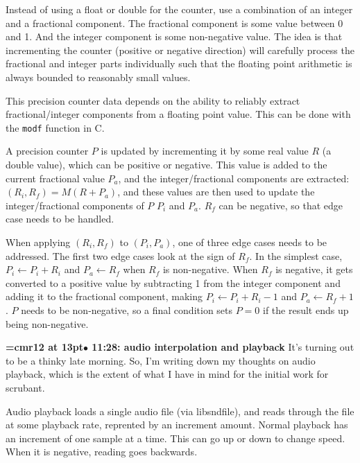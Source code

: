 Instead of using a float or double for the counter, use a combination of an integer and a fractional component. The fractional component is some value between 0 and 1. And the integer component is some non-negative value. The idea is that incrementing the counter (positive or negative direction) will carefully process the fractional and integer parts individually such that the floating point arithmetic is always bounded to reasonably small values.
\par

This precision counter data depends on the ability to reliably extract fractional/integer components from a floating point value. This can be done with the {\tt modf} function in C.
\par

A precision counter $P$ is updated by incrementing it by some real value $R$ (a double value), which can be positive or negative. This value is added to the current fractional value $P_a$, and the integer/fractional components are extracted: $(R_i, R_f) = M(R + P_a)$, and these values are then used to update the integer/fractional components of $P$ $P_i$ and $P_a$. $R_f$ can be negative, so that edge case needs to be handled.
\par

When applying $(R_i, R_f)$ to $(P_i, P_a)$, one of three edge cases needs to be addressed. The first two edge cases look at the sign of $R_f$. In the simplest case, $P_i \leftarrow P_i + R_i$ and $P_a \leftarrow R_f$ when $R_f$ is non-negative. When $R_f$ is negative, it gets converted to a positive value by subtracting 1 from the integer component and adding it to the fractional component, making $P_i \leftarrow P_i + R_i - 1$ and $P_a \leftarrow R_f + 1$. $P$ needs to be non-negative, so a final condition sets $P = 0$ if the result ends up being non-negative.
\par

{\smallskip\noindent\bf\font\titlefont=cmr12 at 13pt\titlefont $\bullet$ 11:28: audio interpolation and playback}\smallskip
It's turning out to be a thinky late morning. So, I'm writing down my thoughts on audio playback, which is the extent of what I have in mind for the initial work for scrubant.
\par

Audio playback loads a single audio file (via libsndfile), and reads through the file at some playback rate, reprented by an increment amount. Normal playback has an increment of one sample at a time. This can go up or down to change speed. When it is negative, reading goes backwards.
\par

